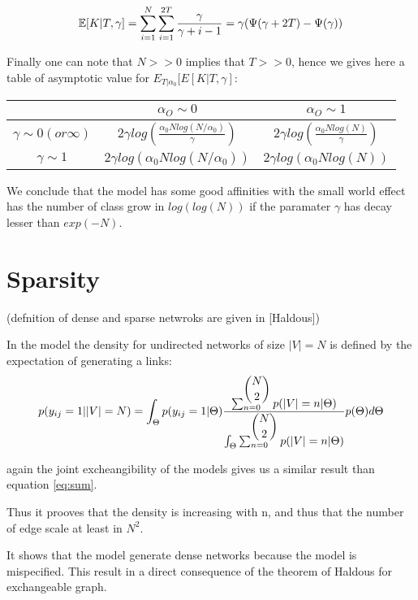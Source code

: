 \documentclass[a4paper, 12pt]{article}
\begin{document}
\begin{equation}
\mathbb{E}[K|T, \gamma] = \sum_{i=1}^N\sum_{i=1}^{2T} \frac{\gamma}{\gamma +i-1} = \gamma (\Psi(\gamma+2T) - \Psi(\gamma))
\end{equation}

Finally one can note that $N >> 0$ implies that $T>>0$, hence we gives here a table of asymptotic value for $E_{T|\alpha_0}[E[K|T, \gamma]$:
\begin{table}[h]
	\begin{tabular}{c|cc}
		 & $\alpha_O \sim 0$&$\alpha_O \sim 1$ \\
		\hline
		$\gamma \sim 0 (or \infty)$ & $2\gamma log(\frac{\alpha_0Nlog(N/\alpha_0)}{\gamma})$ & $2\gamma log(\frac{\alpha_0Nlog(N)}{\gamma})$ \\
		$\gamma \sim 1$ & $2\gamma log(\alpha_0Nlog(N/\alpha_0))$ &  $2\gamma log(\alpha_0Nlog(N))$
	\end{tabular}
\end{table}

We conclude that the model has some good affinities with the small world effect has the number of class grow in $log(log(N))$ if the paramater $\gamma$ has decay lesser than $exp(-N)$.


\section{Sparsity}
(defnition of dense and sparse netwroks are given in [Haldous])

In the model the density for undirected networks of size $|V|=N$ is defined by the expectation of generating a links:
\begin{equation}
p(y_{ij}=1| |V|=N) =  \int_{\Theta} p(y_{ij}=1|\Theta) \frac{\sum_{n=0}^{\dbinom{N}{2}} p(|V|=n | \Theta)}{\int_{\Theta}\sum_{n=0}^{\dbinom{N}{2}}p(|V|=n | \Theta)} p(\Theta) d\Theta
\end{equation}

again the joint excheangibility of the models gives us a similar result than equation \eqref{eq:sum}.

Thus it prooves that the density is increasing with n, and thus that the number of edge scale at least in $N^2$. 

It shows that the model generate dense networks because the model is mispecified. This result in a direct consequence of the theorem of Haldous for exchangeable graph.
\end{document}
